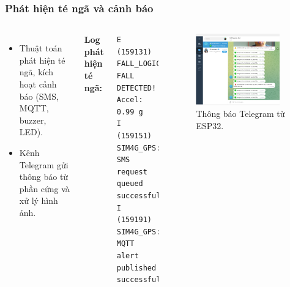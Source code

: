 \begin{frame}[t,fragile]
\frametitle{Phát hiện té ngã và cảnh báo}
\begin{columns}[T]
    \begin{itemize}
        \item Thuật toán phát hiện té ngã, kích hoạt cảnh báo (SMS, MQTT, buzzer, LED).
        \item Kênh Telegram gửi thông báo từ phần cứng và xử lý hình ảnh.
    \end{itemize}
    \textbf{Log phát hiện té ngã:}
    \begin{verbatim}
E (159131) FALL_LOGIC: FALL DETECTED! Accel: 0.99 g
I (159151) SIM4G_GPS: SMS request queued successfully
I (159191) SIM4G_GPS: MQTT alert published successfully
    \end{verbatim}
    \begin{figure}
        \centering
        \includegraphics[width=0.9\textwidth]{images/telegram_fall_module1_send.png}
        \caption{Thông báo Telegram từ ESP32.}
        \label{fig:telegram_hw}
    \end{figure}
\end{columns}
\end{frame}

